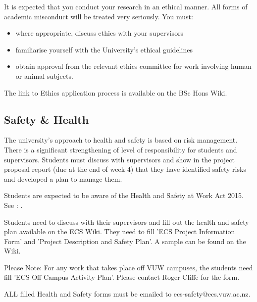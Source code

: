 It is expected that you conduct your research in an ethical
manner. All forms of academic misconduct will be treated very
seriously. You must:

\begin{itemize}
\item where appropriate, discuss ethics with your supervisors
\item familiarise yourself with the University’s ethical guidelines
\item obtain approval from the relevant ethics committee for work involving human or animal subjects.
\end{itemize}
The link to Ethics application process is available on the BSc Hons Wiki.

\subsection{Safety \& Health}
The university's approach to health and safety is based on risk management. There is a significant strengthening of level of responsibility for students and supervisors. Students must discuss with supervisors and show in the project proposal report (due at the end of week 4) that they have identified safety risks and developed a plan to manage them.

\noindent Students are expected to be aware of the Health and Safety at Work Act 2015. See : .


Students need to discuss with their supervisors and fill out the health and safety plan available on the ECS Wiki. They need to fill 'ECS Project Information Form' and 'Project Description and Safety Plan'. A sample can be found on the Wiki.

Please Note: For any work that takes place off VUW campuses, the students need fill 'ECS Off Campus Activity Plan'. Please contact Roger Cliffe for the form.

ALL filled Health and Safety forms must be emailed to ecs-safety@ecs.vuw.ac.nz.
